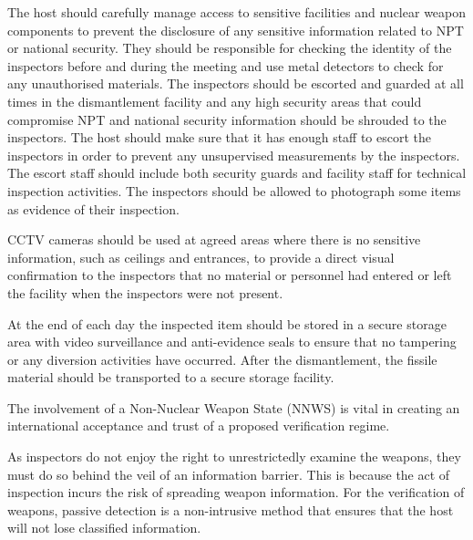 \documentclass[twoside,titlepage,11pt,twocolumn,a4paper]{article}
\begin{document}
The host should carefully manage access to sensitive facilities and
nuclear weapon components to prevent the disclosure of any sensitive
information related to NPT or national security. They should be
responsible for checking the identity of the inspectors before and
during the meeting and use metal detectors to check for any
unauthorised materials. The inspectors should be escorted and guarded
at all times in the dismantlement facility and any high security areas
that could compromise NPT and national security information should be
shrouded to the inspectors. The host should make sure that it has
enough staff to escort the inspectors in order to prevent any
unsupervised measurements by the inspectors. The escort staff should
include both security guards and facility staff for technical
inspection activities. The inspectors should be allowed to photograph
some items as evidence of their inspection.

CCTV cameras should be used at agreed areas where there is no
sensitive information, such as ceilings and entrances, to provide a
direct visual confirmation to the inspectors that no material or
personnel had entered or left the facility when the inspectors were
not present.

At the end of each day the inspected item should be stored in a secure
storage area with video surveillance and anti-evidence seals to ensure
that no tampering or any diversion activities have occurred. After the
dismantlement, the fissile material should be transported to a secure
storage facility.

The involvement of a Non-Nuclear Weapon State (NNWS) is vital in
creating an international acceptance and trust of a proposed
verification regime.

As inspectors do not enjoy the right to unrestrictedly examine the
weapons, they must do so behind the veil of an information
barrier. This is because the act of inspection incurs the risk of
spreading weapon information. For the verification of weapons, passive
detection is a non-intrusive method that ensures that the host will
not lose classified information.
\end{document}

